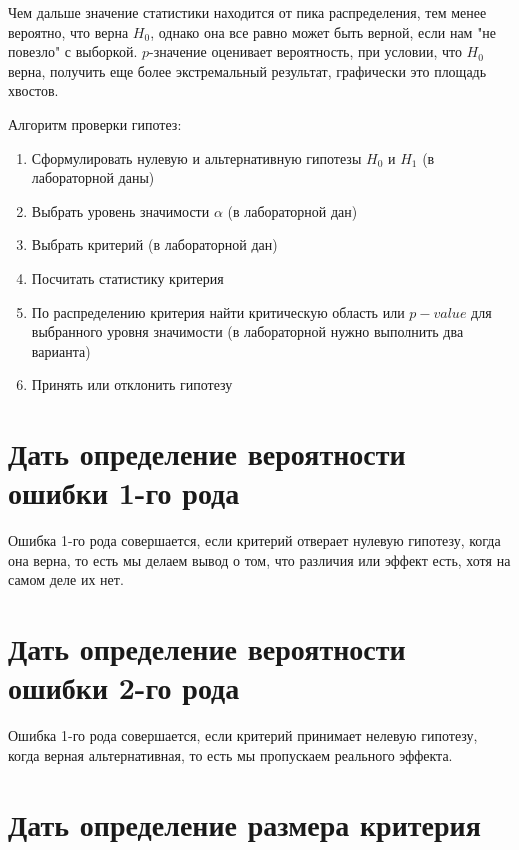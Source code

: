 \documentclass{article}
\begin{document}
Чем дальше значение статистики находится от пика распределения, тем менее вероятно, что верна $H_0$, однако она все равно может быть верной, если нам "не повезло" с выборкой. $p$-значение оценивает вероятность, при условии, что $H_0$ верна, получить еще более экстремальный результат, графически это площадь хвостов.

Алгоритм проверки гипотез:
\begin{enumerate}[topsep=-\baselineskip, partopsep=2pt, itemsep=2pt, parsep=0pt]
    \item Сформулировать нулевую и альтернативную гипотезы $H_0$ и $H_1$ (в лабораторной даны)
    \item Выбрать уровень значимости $\alpha$ (в лабораторной дан)
    \item Выбрать критерий (в лабораторной дан)
    \item Посчитать статистику критерия
    \item По распределению критерия найти критическую область или $p-value$ для выбранного уровня значимости (в лабораторной нужно выполнить два варианта)
    \item Принять или отклонить гипотезу
\end{enumerate}


\section{Дать определение вероятности ошибки 1-го рода}

Ошибка 1-го рода совершается, если критерий отверает нулевую гипотезу, когда она верна, то есть мы делаем вывод о том, что различия или эффект есть, хотя на самом деле их нет.


\section{Дать определение вероятности ошибки 2-го рода}

Ошибка 1-го рода совершается, если критерий принимает нелевую гипотезу, когда верная альтернативная, то есть мы пропускаем реального эффекта.


\section{Дать определение размера критерия}
\end{document}
